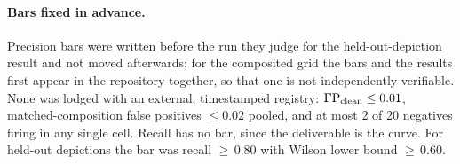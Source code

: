 \paragraph{Bars fixed in advance.}
Precision bars were written before the run they judge for the held-out-depiction result and not
moved afterwards; for the composited grid the bars and the results first appear in the repository
together, so that one is not independently verifiable. None was lodged with an external,
timestamped registry: $\mathrm{FP}_\text{clean} \le 0.01$, matched-composition
false positives $\le 0.02$ pooled, and at most 2 of 20 negatives firing in any single cell.
Recall has no bar, since the deliverable is the curve.
For held-out depictions the bar was recall ${\ge}\,0.80$ with Wilson lower bound ${\ge}\,0.60$.
